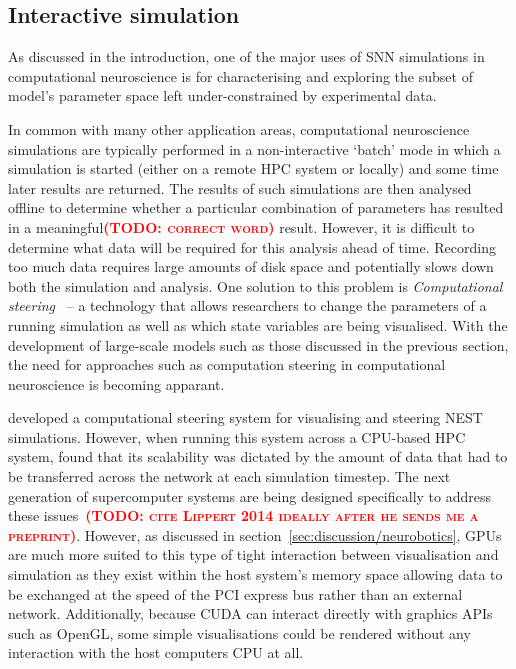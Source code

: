 \documentclass[utf8]{frontiersSCNS} %
\newcommand{\todo}[1]{\textbf{\textsc{\textcolor{red}{(TODO: #1)}}}}
\begin{document}
\subsection{Interactive simulation}
As discussed in the introduction, one of the major uses of SNN simulations in computational neuroscience is for characterising and exploring the subset of model's parameter space left under-constrained by experimental data.

In common with many other application areas, computational neuroscience simulations are typically performed in a non-interactive `batch' mode in which a simulation is started (either on a remote HPC system or locally) and some time later results are returned.
The results of such simulations are then analysed offline to determine whether a particular combination of parameters has resulted in a meaningful\todo{correct word} result.
However, it is difficult to determine what data will be required for this analysis ahead of time.
Recording too much data requires large amounts of disk space and potentially slows down both the simulation and analysis.
One solution to this problem is \textit{Computational steering}~\citep{Parker1997} -- a technology that allows researchers to change the parameters of a running simulation as well as which state variables are being visualised.
With the development of large-scale models such as those discussed in the previous section, the need for approaches such as computation steering in computational neuroscience is becoming apparant.

\citet{Nowke2018} developed a computational steering system for visualising and steering NEST simulations.
However, when running this system across a CPU-based HPC system, \citeauthor{Nowke2018} found that its scalability was dictated by the amount of data that had to be transferred across the network at each simulation timestep.
The next generation of supercomputer systems are being designed specifically to address these issues~\todo{cite Lippert 2014 ideally after he sends me a preprint}.
However, as discussed in section~\ref{sec:discussion/neurobotics}, GPUs are much more suited to this type of tight interaction between visualisation and simulation as they exist within the host system's memory space allowing data to be exchanged at the speed of the PCI express bus rather than an external network.
Additionally, because CUDA can interact directly with graphics APIs such as OpenGL, some simple visualisations could be rendered without any interaction with the host computers CPU at all.
\end{document}
